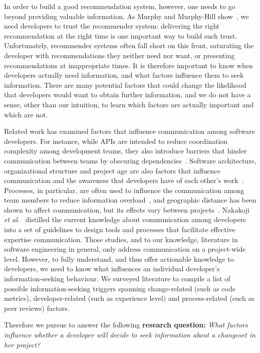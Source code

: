 \documentclass[12pt,oneside]{book}
\begin{document}
In order to build a good recommendation system, however, one needs to go beyond providing valuable information. As Murphy and Murphy-Hill show~\cite{murphy:rsse:2010}, we need developers to trust the recommender system: delivering the right recommendation at the right time is one important way to build such trust. Unfortunately, recommender systems often fall short on this front, saturating the developer with recommendations they neither need nor want, or presenting recommendations at inappropriate times. It is therefore important to know when developers actually need information, and what factors influence them to seek information. There are many potential factors that could change the likelihood that developers would want to obtain further information, and we do not have a sense, other than our intuition, to learn which factors are actually important and which are not.
\vspace{-2pt}

Related work has examined factors that influence communication among software developers. For instance, while APIs are intended to reduce coordination complexity among development teams, they also introduce barriers that hinder communication between teams by obscuring dependencies~\cite{souza:cscw:2004,desouza:fse:2004}.
Software architecture, organizational structure and project age are also factors that influence communication and the awareness that developers have of each other's work~\cite{cleidson:tse:2011}. 
Processes, in particular, are often used to influence the communication among team members to reduce information overload~\cite{fussell:cscw:1998}, and geographic distance has been shown to affect communication, but its effects vary between projects~\cite{herbsleb:icse:2001,wolf:spip:2008}.
Nakakoji \emph{et al.}~\cite{nakakoji2010:rdc} distilled the current knowledge about communication among developers into a set of guidelines to design tools and processes that facilitate effective expertise communication.
Those studies, and to our knowledge, literature in software engineering in general, only address communication on a project-wide level. However, to fully understand, and thus offer actionable knowledge to developers, we need to know what influences an individual developer's information-seeking behaviour.
We surveyed literature to compile a list of possible information-seeking triggers spanning change-related (such as code metrics), developer-related (such as experience level) and process-related (such as peer reviews) factors.

Therefore we pursue to answer the following \textbf{research question:}
 \emph{What factors influence whether a developer will decide to seek information about a changeset in her project?}
\end{document}
